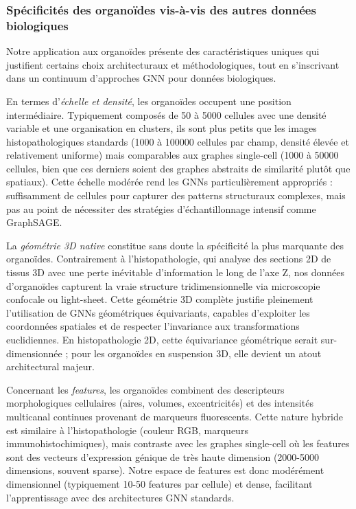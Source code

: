 \subsubsection{Spécificités des organoïdes vis-à-vis des autres données biologiques}

Notre application aux organoïdes présente des caractéristiques uniques qui justifient certains choix architecturaux et méthodologiques, tout en s'inscrivant dans un continuum d'approches GNN pour données biologiques.

En termes d'\textit{échelle et densité}, les organoïdes occupent une position intermédiaire. Typiquement composés de 50 à 5000 cellules avec une densité variable et une organisation en clusters, ils sont plus petits que les images histopathologiques standards (1000 à 100000 cellules par champ, densité élevée et relativement uniforme) mais comparables aux graphes single-cell (1000 à 50000 cellules, bien que ces derniers soient des graphes abstraits de similarité plutôt que spatiaux). Cette échelle modérée rend les GNNs particulièrement appropriés : suffisamment de cellules pour capturer des patterns structuraux complexes, mais pas au point de nécessiter des stratégies d'échantillonnage intensif comme GraphSAGE.

La \textit{géométrie 3D native} constitue sans doute la spécificité la plus marquante des organoïdes. Contrairement à l'histopathologie, qui analyse des sections 2D de tissus 3D avec une perte inévitable d'information le long de l'axe Z, nos données d'organoïdes capturent la vraie structure tridimensionnelle via microscopie confocale ou light-sheet. Cette géométrie 3D complète justifie pleinement l'utilisation de GNNs géométriques équivariants, capables d'exploiter les coordonnées spatiales et de respecter l'invariance aux transformations euclidiennes. En histopathologie 2D, cette équivariance géométrique serait sur-dimensionnée ; pour les organoïdes en suspension 3D, elle devient un atout architectural majeur.

Concernant les \textit{features}, les organoïdes combinent des descripteurs morphologiques cellulaires (aires, volumes, excentricités) et des intensités multicanal continues provenant de marqueurs fluorescents. Cette nature hybride est similaire à l'histopathologie (couleur RGB, marqueurs immunohistochimiques), mais contraste avec les graphes single-cell où les features sont des vecteurs d'expression génique de très haute dimension (2000-5000 dimensions, souvent sparse). Notre espace de features est donc modérément dimensionnel (typiquement 10-50 features par cellule) et dense, facilitant l'apprentissage avec des architectures GNN standards.

